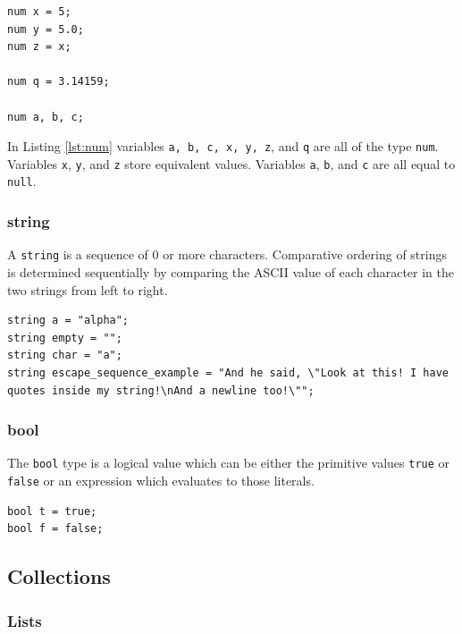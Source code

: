 \documentclass{article}
\newcommand{\code}[1]{\texttt{#1}} %
\begin{document}
\begin{lstlisting}[language=pltLang, caption=Declaration of ``num'' types., label=lst:num]
num x = 5;
num y = 5.0;
num z = x;

num q = 3.14159;

num a, b, c;
\end{lstlisting}

In Listing \ref{lst:num} variables \code{a, b, c, x, y, z}, and \code{q} are all of the type \code{num}. Variables \code{x}, \code{y}, and \code{z} store equivalent values. Variables \code{a}, \code{b}, and \code{c} are all equal to \code{null}.

\subsubsection{string}

A \code{string} is a sequence of 0 or more characters. Comparative ordering of strings is determined sequentially by comparing the ASCII value of each character in the two strings from left to right.

\begin{lstlisting}[language=pltLang, caption=Declaration of ``string'' types., label=lst:string]
string a = "alpha";
string empty = "";
string char = "a";
string escape_sequence_example = "And he said, \"Look at this! I have quotes inside my string!\nAnd a newline too!\"";
\end{lstlisting}

\subsubsection{bool}

The \code{bool} type is a logical value which can be either the primitive values \code{true} or \code{false} or an expression which evaluates to those literals.

\begin{lstlisting}[language=pltLang, caption=Declaration of ``bool'' types., label=lst:bool]
bool t = true;
bool f = false;
\end{lstlisting}

\subsection{Collections}

\subsubsection{Lists}
\end{document}
